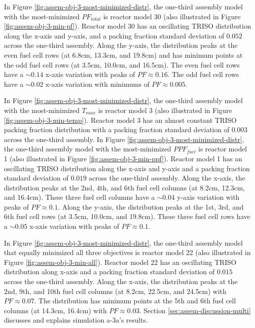 In Figure \ref{fig:assem-obj-3-most-minimized-distr}, the one-third assembly model with 
the most-minimized $PF_{total}$ is reactor model 30 (also illustrated in Figure 
\ref{fig:assem-obj-3-min-pf}). 
Reactor model 30 has an oscillating TRISO distribution along the 
x-axis and y-axis, and a packing fraction standard deviation of $0.052$ across the 
one-third assembly. 
Along the y-axis, the distribution peaks at the even fuel cell rows (at 6.8cm, 
13.3cm, and 19.8cm) and has minimum points at the odd fuel cell rows (at 3.5cm, 
10.0cm, and 16.5cm). 
The even fuel cell rows have a ${\sim}0.14$ x-axis variation with peaks of 
$PF\approx0.16$. 
The odd fuel cell rows have a ${\sim}0.02$ x-axis variation with minimums of 
$PF\approx0.005$. 

In Figure \ref{fig:assem-obj-3-most-minimized-distr}, the one-third assembly model with 
the most-minimized $T_{max}$ is reactor model 3 (also illustrated in Figure 
\ref{fig:assem-obj-3-min-temp}). 
Reactor model 3 has an almost constant TRISO packing fraction distribution with 
a packing fraction standard deviation of $0.003$ across the one-third assembly. 
In Figure \ref{fig:assem-obj-3-most-minimized-distr}, the one-third assembly model with 
the most-minimized $PPF_{fuel}$ is reactor model 1 (also illustrated in Figure 
\ref{fig:assem-obj-3-min-ppf}).
Reactor model 1 has an oscillating TRISO distribution along the 
x-axis and y-axis and a packing fraction standard deviation of $0.019$ across the 
one-third assembly.
Along the x-axis, the distribution peaks at the 2nd, 4th, and 6th fuel cell columns (at 
8.2cm, 12.3cm, and 16.4cm). 
These three fuel cell columns have a ${\sim}0.04$ y-axis variation with peaks of 
$PF\approx0.1$. 
Along the y-axis, the distribution peaks at the 1st, 3rd, and 6th fuel cell rows (at 
3.5cm, 10.0cm, and 19.8cm).
These three fuel cell rows have a ${\sim}0.05$ x-axis variation with peaks of 
$PF\approx0.1$. 

In Figure \ref{fig:assem-obj-3-most-minimized-distr}, the one-third assembly model that 
equally minimized all three objectives is reactor model 22 (also illustrated in Figure 
\ref{fig:assem-obj-3-min-all}).
Reactor model 22 has an oscillating TRISO distribution along x-axis and a packing 
fraction standard deviation of $0.015$ across the one-third assembly. 
Along the x-axis, the distribution peaks at the 2nd, 9th, and 10th fuel cell columns 
(at 8.2cm, 22.5cm, and 24.5cm) with $PF\approx0.07$.
The distribution has minimum points at the 5th and 6th fuel cell columns (at 14.3cm, 
16.4cm) with $PF\approx0.03$.
Section \ref{sec:assem-discussion-multi} discusses and explains simulation a-3a's 
results.

